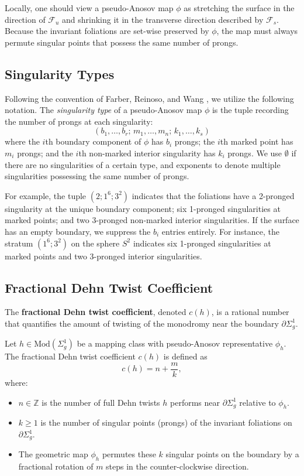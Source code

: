 Locally, one should view a pseudo-Anosov map $\phi$ as stretching the surface in the direction of $\mathcal{F}_u$ and shrinking it in the transverse direction described by $\mathcal{F}_s$. Because the invariant foliations are set-wise preserved by $\phi$, the map must always permute singular points that possess the same number of prongs.

\subsection*{Singularity Types}
Following the convention of Farber, Reinoso, and Wang \cite{farber2024fixed}, we utilize the following notation. The \emph{singularity type} of a pseudo-Anosov map $\phi$ is the tuple recording the number of prongs at each singularity:
\[
(b_1, \dots, b_r; \, m_1, \dots, m_n; \, k_1, \dots, k_s)
\]
where the $i$th boundary component of $\phi$ has $b_i$ prongs; the $i$th marked point has $m_i$ prongs; and the $i$th non-marked interior singularity has $k_i$ prongs. We use $\emptyset$ if there are no singularities of a certain type, and exponents to denote multiple singularities possessing the same number of prongs.

For example, the tuple $(2; 1^6; 3^2)$ indicates that the foliations have a 2-pronged singularity at the unique boundary component; six 1-pronged singularities at marked points; and two 3-pronged non-marked interior singularities. If the surface has an empty boundary, we suppress the $b_i$ entries entirely. For instance, the stratum $(1^6; 3^2)$ on the sphere $S^2$ indicates six 1-pronged singularities at marked points and two 3-pronged interior singularities.

\subsection{Fractional Dehn Twist Coefficient}\label{subsection:FDTC}
The \textbf{fractional Dehn twist coefficient}, denoted $c(h)$, is a rational number that quantifies the amount of twisting of the monodromy near the boundary $\partial \Sigma_g^1$.

\begin{definition}
\label{def:fdtc}
Let $h \in \mathrm{Mod}(\Sigma_g^1)$ be a mapping class with pseudo-Anosov representative $\phi_h$. The fractional Dehn twist coefficient $c(h)$ is defined as
\[
c(h) = n + \frac{m}{k},
\]
where:
\begin{itemize}
    \item $n \in \mathbb{Z}$ is the number of full Dehn twists $h$ performs near $\partial \Sigma_g^1$ relative to $\phi_h$.
    \item $k \geq 1$ is the number of singular points (prongs) of the invariant foliations on $\partial \Sigma_g^1$.
    \item The geometric map $\phi_h$ permutes these $k$ singular points on the boundary by a fractional rotation of $m$ steps in the counter-clockwise direction.
\end{itemize}
\end{definition}

